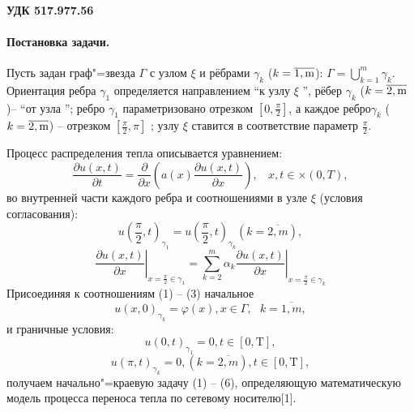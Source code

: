\paragraph{УДК 517.977.56 }
\vzmscaption
\paragraph{Постановка задачи.}
Пусть задан граф"=звезда $\Gamma$ с узлом $\xi$ и рёбрами $\gamma_k$ ($k=\overline{\rm 1,m}$): $\Gamma=\bigcup\limits_{k=1}^{m}{{{\gamma }_{k}}}$. Ориентация ребра $\gamma_1$ определяется направлением “к узлу $\xi$ ”, рёбер $\gamma_k$ ($k=\overline{\rm 2,m}$)– “от узла ”; ребро $\gamma_1$ параметризовано отрезком $[0,\frac{\pi}{2}] $, а каждое ребро$\gamma_k$ ($k=\overline{\rm 2,m}$) – отрезком $[\frac{\pi}{2},\pi] $ ; узлу $\xi$ ставится в соответствие параметр $\frac{\pi}{2}$.

Процесс распределения тепла описывается уравнением:
\begin{equation}\label{tran_eq1}
	\frac{\partial u(x,t)}{\partial t}=\frac{\partial }{\partial x}\left( a(x)\frac{\partial u(x,t)}{\partial x} \right),\,\,\,\,~x,t\in \times (0,T),
\end{equation}
во внутренней части каждого ребра и соотношениями в узле $\xi $ (условия согласования):
\begin{equation}\label{tran_eq2}
	u{{\left( \frac{\pi }{2},t \right)}_{{{\gamma }_{1}}}}=u{{\left( \frac{\pi }{2},t \right)}_{{{\gamma }_{k}}}}(k=\overline{2,m}),
\end{equation}
\begin{equation}\label{tran_eq3}
	{{\left. \frac{\partial u(x,t)}{\partial x} \right|}_{x=\frac{\pi }{2}\in {{\gamma }_{1}}}}={{\sum\limits_{k=2}^{m}{{{\alpha }_{k}}\left. \frac{\partial u(x,t)}{\partial x} \right|}}_{x=\frac{\pi }{2}\in {{\gamma }_{k}}}}
\end{equation}
Присоединяя к соотношениям (1) – (3) начальное
\begin{equation}\label{tran_eq4}
u{{(x,0)}_{{{\gamma }_{k}}}}=\varphi (x), x\in \Gamma ,\,\,\,\,k=\overline{1,m},
\end{equation}
и граничные условия:
\begin{equation}\label{tran_eq5}
u{{(0,t)}_{{{\gamma }_{1}}}}=0,t\in \left[ 0,\text{T} \right],
\end{equation}
\begin{equation}\label{tran_eq6}
u{{(\pi ,t)}_{{{\gamma }_{k}}}}=0,(k=\overline{2,m}), t\in \left[ 0,\text{T} \right],
\end{equation}
получаем начально"=краевую задачу (1) – (6), определяющую математическую модель процесса переноса тепла по сетевому носителю[1].
